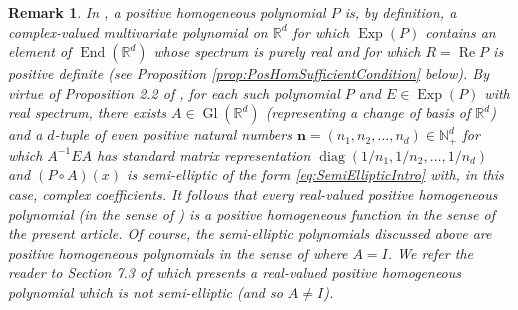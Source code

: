 \documentclass[11pt, letter]{book}
\newtheorem{remark}{Remark}
\newenvironment{example}
  {\pushQED{\qed}\renewcommand{\qedsymbol}{$\triangle$}\examplex}
  {\popQED\endexamplex}
\renewcommand\Re{\operatorname{Re}}%
\newcommand\End{\operatorname{End}} %
\newcommand\Gl{\operatorname{Gl}} %
\newcommand\Exp{\operatorname{Exp}}
\newcommand\diag{\operatorname{diag}}
\begin{document}
\begin{example}
\begin{remark}
In \cite{randles_convolution_2017}, a positive homogeneous polynomial $P$ is, by definition, a complex-valued multivariate polynomial on $\mathbb{R}^d$ for which $\Exp(P)$ contains an element of $\End(\mathbb{R}^d)$ whose spectrum is purely real and for which $R=\Re P$ is positive definite (see Proposition \ref{prop:PosHomSufficientCondition} below). By virtue of Proposition 2.2 of \cite{randles_convolution_2017}, for each such polynomial $P$ and $E\in\Exp(P)$ with real spectrum, there exists $A\in\Gl(\mathbb{R}^d)$ (representing a change of basis of $\mathbb{R}^d$) and a $d$-tuple of even positive natural numbers $\mathbf{n}=(n_1,n_2,\dots,n_d)\in\mathbb{N}_+^d$ for which $A^{-1}EA$ has standard matrix representation $\diag(1/n_1,1/n_2,\dots,1/n_d)$ and $(P\circ A)(x)$ is semi-elliptic of the form \eqref{eq:SemiEllipticIntro} with, in this case, complex coefficients. It follows that every real-valued positive homogeneous polynomial (in the sense of \cite{randles_convolution_2017}) is a positive homogeneous function in the sense of the present article. Of course, the semi-elliptic polynomials discussed above are positive homogeneous polynomials in the sense of \cite{randles_convolution_2017} where $A=I$. We refer the reader to Section 7.3 of \cite{randles_convolution_2017} which presents a real-valued positive homogeneous polynomial which is not semi-elliptic (and so $A\neq I$).
\end{remark}
\end{example}
\end{document}
